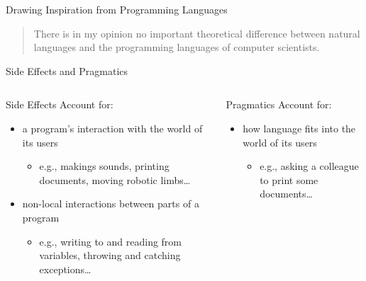 \documentclass{beamer}
\begin{document}
\begin{frame}
  \begin{center}
    \vfill

    {\huge Drawing Inspiration from Programming Languages}

    \vfill

    \begin{quotation}
      There is in my opinion no important theoretical difference between
      natural languages and the programming languages of computer
      scientists.
    \end{quotation}
  \end{center}
\end{frame}


\begin{frame}{Side Effects and Pragmatics}
  \begin{columns}
    \begin{column}{0.5\textwidth}
   \begin{block}{Side Effects}
   Account for:
  \pause
  \vfill
  \begin{itemize}
  \item a program's interaction with the world of its users
    \begin{itemize}
    \item e.g., makings sounds, printing documents, moving robotic limbs\ldots
    \end{itemize}
  \end{itemize}
  \pause
  \vfill
  \begin{itemize}
  \item non-local interactions between parts of a program
    \begin{itemize}
    \item e.g., writing to and reading from variables, throwing and
      catching exceptions\ldots
    \end{itemize}
  \end{itemize}
  \end{block}
   \pause
    \end{column}
    \begin{column}{0.5\textwidth}
      \begin{block}{Pragmatics}
        Account for:
        \pause
        \vfill
        \begin{itemize}
        \item how language fits into the world of its users
          \begin{itemize}
          \item e.g., asking a colleague to print some documents\ldots

\end{itemize}
\end{itemize}
\end{block}
\end{column}
\end{columns}
\end{frame}
\end{document}
